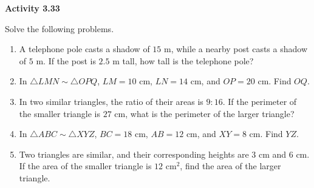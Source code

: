 \vspace{0.3ex}
\noindent\textbf{Activity 3.33}

\vspace{0.2ex}

Solve the following problems.

\begin{enumerate}
    \item A telephone pole casts a shadow of $15$ m, while a nearby post casts a shadow of $5$ m. If the post is $2.5$ m tall, how tall is the telephone pole?
    \item In $\triangle LMN \sim \triangle OPQ$, $LM = 10$ cm, $LN = 14$ cm, and $OP = 20$ cm. Find $OQ$.
    \item In two similar triangles, the ratio of their areas is $9:16$. If the perimeter of the smaller triangle is $27$ cm, what is the perimeter of the larger triangle?
    \item In $\triangle ABC \sim \triangle XYZ$, $BC = 18$ cm, $AB = 12$ cm, and $XY = 8$ cm. Find $YZ$.
    \item Two triangles are similar, and their corresponding heights are $3$ cm and $6$ cm. If the area of the smaller triangle is $12$ cm$^2$, find the area of the larger triangle.
\end{enumerate}
